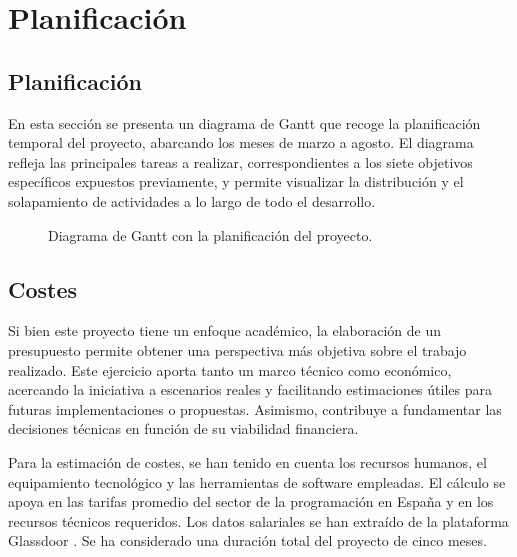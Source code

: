 \chapter{Planificación}

\section{Planificación}

En esta sección se presenta un diagrama de Gantt que recoge la planificación temporal del proyecto, abarcando los meses de marzo a agosto. El diagrama refleja las principales tareas a realizar, correspondientes a los siete objetivos específicos expuestos previamente, y permite visualizar la distribución y el solapamiento de actividades a lo largo de todo el desarrollo.

\begin{figure}[H]
    \centering
    \caption{Diagrama de Gantt con la planificación del proyecto.}
\end{figure}

\section{Costes}

Si bien este proyecto tiene un enfoque académico, la elaboración de un presupuesto permite obtener una perspectiva más objetiva sobre el trabajo realizado. Este ejercicio aporta tanto un marco técnico como económico, acercando la iniciativa a escenarios reales y facilitando estimaciones útiles para futuras implementaciones o propuestas. Asimismo, contribuye a fundamentar las decisiones técnicas en función de su viabilidad financiera.

Para la estimación de costes, se han tenido en cuenta los recursos humanos, el equipamiento tecnológico y las herramientas de software empleadas. El cálculo se apoya en las tarifas promedio del sector de la programación en España y en los recursos técnicos requeridos. Los datos salariales se han extraído de la plataforma Glassdoor \cite{glassdoor}. Se ha considerado una duración total del proyecto de cinco meses.

